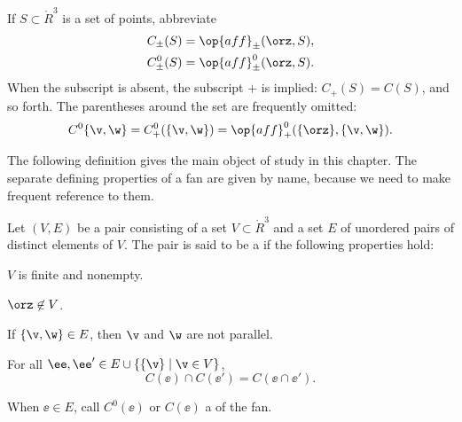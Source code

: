 

If $S\subset\ring{R}^3$ is a set of points,
abbreviate
\begin{align*}
C_\pm(S) &= \op{aff}_\pm(\orz,S),\\
C^0_\pm(S) &= \op{aff}^0_\pm(\orz,S).\\
\end{align*}
When the subscript is absent, the subscript $+$ is implied: $C_+(S)
= C(S)$, and so forth.  The parentheses around the set are frequently
omitted:
\begin{displaymath}C^0\{\v,\w\}=C^0_+(\{\v,\w\}) =
\op{aff}^0_+(\{\orz\},\{\v,\w\}).\end{displaymath}

The following definition gives the main object of study in this chapter.  The separate
defining properties of a fan are given by name, because we need to make frequent
reference to them.

\begin{definition}
Let $(V,E)$ be a pair consisting of a set $V\subset \ring{R}^3$ and
a set $E$ of unordered pairs of distinct elements of $V$.  The pair
is said to be a  if the following properties hold:
\begin{description}
\item {} $V$ is finite and  nonempty.
\item {} $\orz\not\in V$.
\item {} If $\{\v,\w\} \in E$, then $\v$ and $\w$
are not parallel.
\item {}
For all $\ee ,\ee '\in E \cup \{\{\v\}\mid \v\in V\}$, 
\begin{displaymath}C(\ee )\cap C(\ee ') = C(\ee \cap \ee
').\end{displaymath}
\end{description}
When $\ee\in E$, call $C^0(\ee)$ or $C(\ee)$ a 
of the fan.
\end{definition}
%
%
%
%
%
%


